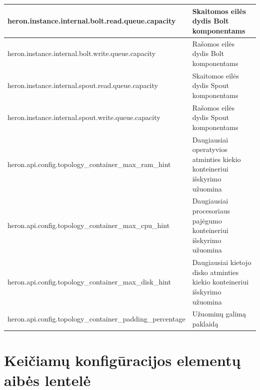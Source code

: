 \documentclass{VUMIFPSbakalaurinis}
\begin{document}
\begin{longtable}{|p{0.59\linewidth}|p{0.41\linewidth}|}
    heron.instance.internal.bolt.read.queue.capacity                      & Skaitomos eilės dydis Bolt komponentams                                        \\ \hline
    heron.instance.internal.bolt.write.queue.capacity                     & Rašomos eilės dydis Bolt komponentams                                          \\ \hline
    heron.instance.internal.spout.read.queue.capacity                     & Skaitomos eilės dydis Spout komponentams                                       \\ \hline
    heron.instance.internal.spout.write.queue.capacity                    & Rašomos eilės dydis Spout komponentams                                         \\ \hline
    heron.api.config.topology\_container\_max\_ram\_hint                  & Daugiausiai operatyvios atminties kiekio konteineriui išskyrimo užuomina       \\ \hline
    heron.api.config.topology\_container\_max\_cpu\_hint                  & Daugiausiai procesoriaus pajėgumo konteineriui išskyrimo užuomina              \\ \hline
    heron.api.config.topology\_container\_max\_disk\_hint                 & Daugiausiai kietojo disko atminties kiekio konteineriui išskyrimo užuomina    \\ \hline
    heron.api.config.topology\_container\_padding\_percentage             & Užuominų galimą paklaidą                                                       \\ \hline
\end{longtable}

\section{Keičiamų konfigūracijos elementų aibės lentelė}
\end{document}
